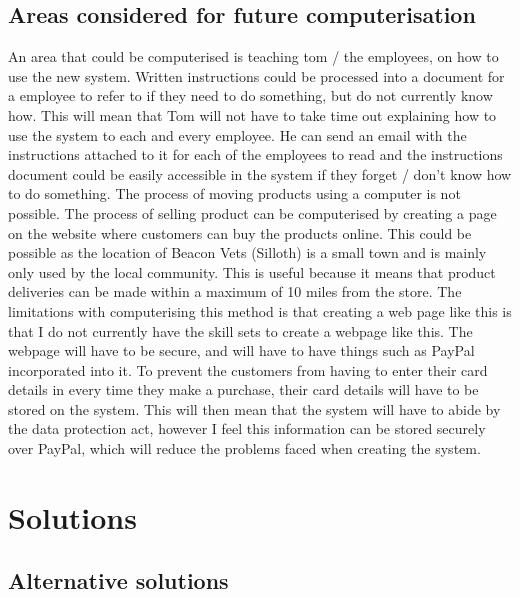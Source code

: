 \subsection{Areas considered for future computerisation}

\begin{flushleft}
An area that could be computerised is teaching tom / the employees, on how to use the new system. Written instructions could be processed into a document for a employee to refer to if they need to do something, but do not currently know how. This will mean that Tom will not have to take time out explaining how to use the system to each and every employee. He can send an email with the instructions attached to it for each of the employees to read and the instructions document could be easily accessible in the system if they forget / don't know how to do something. The process of moving products using a computer is not possible. The process of selling product can be computerised by creating a page on the website where customers can buy the products online. This could be possible as the location of Beacon Vets (Silloth) is a small town and is mainly only used by the local community. This is useful because it means that product deliveries can be made within a maximum of 10 miles from the store. The limitations with computerising this method is that creating a web page like this is that I do not currently have the skill sets to create a webpage like this. The webpage will have to be secure, and will have to have things such as PayPal incorporated into it. To prevent the customers from having to enter their card details in every time they make a purchase, their card details will have to be stored on the system. This will then mean that the system will have to abide by the data protection act, however I feel this information can be stored securely over PayPal, which will reduce the problems faced when creating the system.
\end{flushleft}

\section{Solutions}

\subsection{Alternative solutions}



